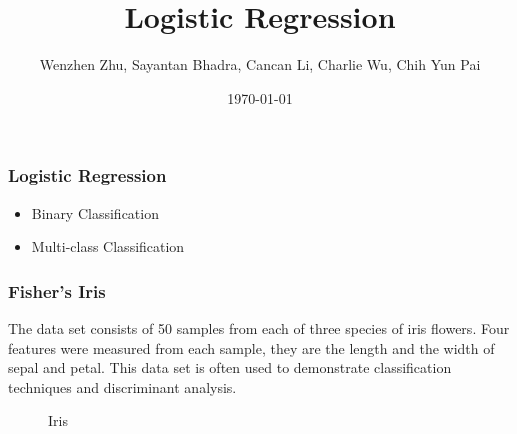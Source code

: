 \documentclass{beamer}
\title[Logistic Regression]{Logistic Regression} %
\author{Wenzhen Zhu, Sayantan Bhadra, Cancan Li, Charlie Wu, Chih Yun Pai} %
\institute[WUSTL] %
{
Washington University in St. Louis \\ %
\medskip
\textit{@wustl.edu} %
}
\date{\today} %
\begin{document}
\begin{frame}
\titlepage %
\end{frame}


\begin{frame}
\frametitle{Logistic Regression}
\begin{itemize}
\item Binary Classification
\item Multi-class Classification
\end{itemize}
\end{frame}

\begin{frame}
\frametitle{Fisher's Iris}
The data set consists of 50 samples from each of three 
species of iris flowers.  Four features were measured from each
sample, they are the length and the width of sepal and petal. This data set is often used
to demonstrate classification techniques and discriminant analysis.
\begin{figure}[htbp] \centering {}
\hspace{20pt} 
\hspace{20pt} 
\caption{Iris } \end{figure}
\end{frame}
\end{document}
